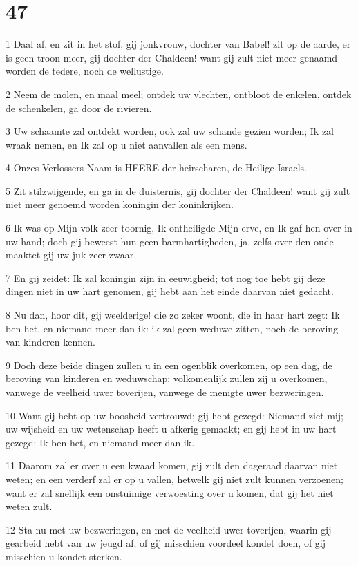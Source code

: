 \chapter{47}

\par 1 Daal af, en zit in het stof, gij jonkvrouw, dochter van Babel! zit op de aarde, er is geen troon meer, gij dochter der Chaldeen! want gij zult niet meer genaamd worden de tedere, noch de wellustige.
\par 2 Neem de molen, en maal meel; ontdek uw vlechten, ontbloot de enkelen, ontdek de schenkelen, ga door de rivieren.
\par 3 Uw schaamte zal ontdekt worden, ook zal uw schande gezien worden; Ik zal wraak nemen, en Ik zal op u niet aanvallen als een mens.
\par 4 Onzes Verlossers Naam is HEERE der heirscharen, de Heilige Israels.
\par 5 Zit stilzwijgende, en ga in de duisternis, gij dochter der Chaldeen! want gij zult niet meer genoemd worden koningin der koninkrijken.
\par 6 Ik was op Mijn volk zeer toornig, Ik ontheiligde Mijn erve, en Ik gaf hen over in uw hand; doch gij beweest hun geen barmhartigheden, ja, zelfs over den oude maaktet gij uw juk zeer zwaar.
\par 7 En gij zeidet: Ik zal koningin zijn in eeuwigheid; tot nog toe hebt gij deze dingen niet in uw hart genomen, gij hebt aan het einde daarvan niet gedacht.
\par 8 Nu dan, hoor dit, gij weelderige! die zo zeker woont, die in haar hart zegt: Ik ben het, en niemand meer dan ik: ik zal geen weduwe zitten, noch de beroving van kinderen kennen.
\par 9 Doch deze beide dingen zullen u in een ogenblik overkomen, op een dag, de beroving van kinderen en weduwschap; volkomenlijk zullen zij u overkomen, vanwege de veelheid uwer toverijen, vanwege de menigte uwer bezweringen.
\par 10 Want gij hebt op uw boosheid vertrouwd; gij hebt gezegd: Niemand ziet mij; uw wijsheid en uw wetenschap heeft u afkerig gemaakt; en gij hebt in uw hart gezegd: Ik ben het, en niemand meer dan ik.
\par 11 Daarom zal er over u een kwaad komen, gij zult den dageraad daarvan niet weten; en een verderf zal er op u vallen, hetwelk gij niet zult kunnen verzoenen; want er zal snellijk een onstuimige verwoesting over u komen, dat gij het niet weten zult.
\par 12 Sta nu met uw bezweringen, en met de veelheid uwer toverijen, waarin gij gearbeid hebt van uw jeugd af; of gij misschien voordeel kondet doen, of gij misschien u kondet sterken.
